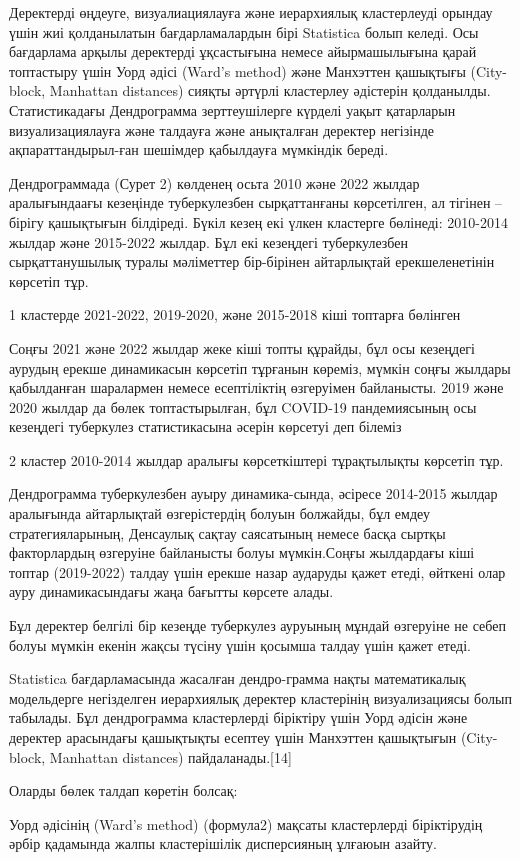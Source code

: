 \begin{multicols}{2}

Деректерді өңдеуге, визуалиациялауға және иерархиялық кластерлеуді
орындау үшін жиі қолданылатын бағдарламалардын бірі Statistica болып
келеді. Осы бағдарлама арқылы деректерді ұқсастығына немесе
айырмашылығына қарай топтастыру үшін Уорд әдісі (Ward's method) және
Манхэттен қашықтығы (City-block, Manhattan distances) сияқты әртүрлі
кластерлеу әдістерін қолданылды. Статистикадағы Дендрограмма
зерттеушілерге күрделі уақыт қатарларын визуализациялауға және талдауға
және анықталған деректер негізінде ақпараттандырыл-ған шешімдер
қабылдауға мүмкіндік береді.

Дендрограммада (Сурет 2) көлденең осьта 2010 және 2022 жылдар
аралығындаағы кезеңінде туберкулезбен сырқаттанғаны көрсетілген, ал
тігінен -- бірігу қашықтығын білдіреді. Бүкіл кезең екі үлкен кластерге
бөлінеді: 2010-2014 жылдар және 2015-2022 жылдар. Бұл екі кезеңдегі
туберкулезбен сырқаттанушылық туралы мәліметтер бір-бірінен айтарлықтай
ерекшеленетінін көрсетіп тұр.

1 кластерде 2021-2022, 2019-2020, және 2015-2018 кіші топтарға бөлінген

Соңғы 2021 және 2022 жылдар жеке кіші топты құрайды, бұл осы кезеңдегі
аурудың ерекше динамикасын көрсетіп тұрғанын көреміз, мүмкін соңғы
жылдары қабылданған шаралармен немесе есептіліктің өзгеруімен
байланысты. 2019 және 2020 жылдар да бөлек топтастырылған, бұл COVID-19
пандемиясының осы кезеңдегі туберкулез статистикасына әсерін көрсетуі
деп білеміз

2 кластер 2010-2014 жылдар аралығы көрсеткіштері тұрақтылықты көрсетіп
тұр.

Дендрограмма туберкулезбен ауыру динамика-сында, әсіресе 2014-2015 жылдар
аралығында айтарлықтай өзгерістердің болуын болжайды, бұл емдеу
стратегияларының, Денсаулық сақтау саясатының немесе басқа сыртқы
факторлардың өзгеруіне байланысты болуы мүмкін.Соңғы жылдардағы кіші
топтар (2019-2022) талдау үшін ерекше назар аударуды қажет етеді,
өйткені олар ауру динамикасындағы жаңа бағытты көрсете алады.

Бұл деректер белгілі бір кезеңде туберкулез ауруының мұндай өзгеруіне не
себеп болуы мүмкін екенін жақсы түсіну үшін қосымша талдау үшін қажет
етеді.

Statistica бағдарламасында жасалған дендро-грамма нақты математикалық
модельдерге негізделген иерархиялық деректер кластерінің визуализациясы
болып табылады. Бұл дендрограмма кластерлерді біріктіру үшін Уорд әдісін
және деректер арасындағы қашықтықты есептеу үшін Манхэттен қашықтығын
(City-block, Manhattan distances) пайдаланады.{[}14{]}

Оларды бөлек талдап көретін болсақ:

Уорд әдісінің (Ward's method) (формула2) мақсаты кластерлерді
біріктірудің әрбір қадамында жалпы кластерішілік дисперсияның ұлғаюын
азайту.
\end{multicols}

